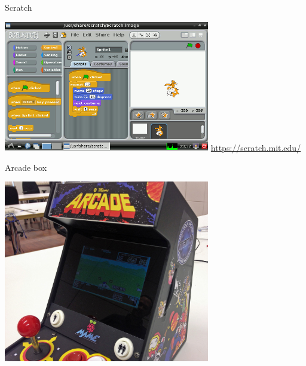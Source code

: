 \documentclass[xcolor=svgnames,11pt]{beamer}
\begin{document}
\begin{frame}{Scratch}
\begin{center}
\includegraphics[width=9cm]{uc/scratch.png}
\newline
\medskip
\url{https://scratch.mit.edu/}
\end{center}
\end{frame}

\begin{frame}{Arcade box}
\begin{center}
\includegraphics[width=9cm]{uc/arcade.jpg}
\end{center}
\end{frame}
\end{document}
